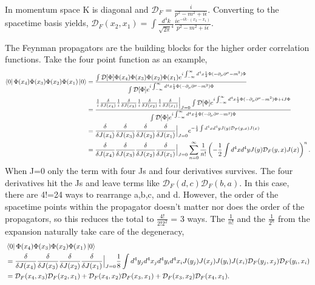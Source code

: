 In momentum space K is diagonal and $\mathcal{D}_F = \frac{i}{p^2-m^2 + i\epsilon}$. Converting to the spacetime basis yields, $\mathcal{D}_F(x_2,x_1) = \int \frac{d^4k}{\sqrt{2\pi}^4}\frac{i e^{-ik\cdot(x_2-x_1)}}{p^2-m^2 + i\epsilon}$. 

The Feynman propagators are the building blocks for the higher order correlation functions. Take the four point function as an example,
%
\begin{equation}
\begin{split}
\bra{0}\Phi(x_4)\Phi(x_3)\Phi(x_2)\Phi(x_1)\ket{0} &= 
\frac{\int \mathcal{D}[\Phi]\Phi(x_4)\Phi(x_3)\Phi(x_2)\Phi(x_1)e^{i\int_{-\infty}^{\infty} d^4x \frac{1}{2}\Phi (-\partial_\mu\partial^\mu - m^2)\Phi}}
{\int \mathcal{D}[\Phi]e^{i\int_{-\infty}^{\infty} d^4x \frac{1}{2}\Phi (-\partial_\mu\partial^\mu - m^2)\Phi}} \\
&= \frac{\frac{1}{i}\frac{\delta}{\delta J(x_4)}\frac{1}{i}\frac{\delta}{\delta J(x_3)}\frac{1}{i}\frac{\delta}{\delta J(x_2)}\frac{1}{i}\frac{\delta}{\delta J(x_1)}\Big|_{J=0}\int \mathcal{D}[\Phi]e^{i\int_{-\infty}^{\infty} d^4x \frac{1}{2}\Phi (-\partial_\mu\partial^\mu - m^2)\Phi + iJ\Phi}}
{\int \mathcal{D}[\Phi]e^{i\int_{-\infty}^{\infty} d^4x \frac{1}{2}\Phi (-\partial_\mu\partial^\mu - m^2)\Phi}} \\
&= \frac{\delta}{\delta J(x_4)}\frac{\delta}{\delta J(x_3)}\frac{\delta}{\delta J(x_2)}\frac{\delta}{\delta J(x_1)}\Big|_{J=0}e^{-\frac{1}{2}\int d^4x d^4y J(y) \mathcal{D}_F(y,x) J(x)} \\
&= \frac{\delta}{\delta J(x_4)}\frac{\delta}{\delta J(x_3)}\frac{\delta}{\delta J(x_2)}\frac{\delta}{\delta J(x_1)}\Big|_{J=0} 
\sum_{n=0}^\infty \frac{1}{n!}\left( -\frac{1}{2}\int d^4x d^4y J(y) \mathcal{D}_F(y,x) J(x) \right)^n. 
\end{split}
\end{equation}
When J=0 only the term with four Js and four derivatives survives. The four derivatives hit the Js and leave terms like $\mathcal{D}_F(d,c) \mathcal{D}_F(b,a)$. In this case, there are 4!=24 ways to rearrange a,b,c, and d. However, the order of the spacetime points within the propagator doesn't matter nor does the order of the propagators, so this reduces the total to $\frac{4!}{2!2^2}$ = 3 ways. The $\frac{1}{n!}$ and the $\frac{1}{2^n}$ from the expansion naturally take care of the degeneracy,
%
\begin{equation}
\begin{split}
&\bra{0}\Phi(x_4)\Phi(x_3)\Phi(x_2)\Phi(x_1)\ket{0} \\
&= \frac{\delta}{\delta J(x_4)}\frac{\delta}{\delta J(x_3)}\frac{\delta}{\delta J(x_2)}\frac{\delta}{\delta J(x_1)}\Big|_{J=0} 
\frac{1}{8}\int d^4y_j d^4x_j d^4y_i d^4x_i J(y_j) J(x_j) J(y_i) J(x_i) \mathcal{D}_F(y_j,x_j) \mathcal{D}_F(y_i,x_i) \\ 
&= \mathcal{D}_F(x_4, x_3) \mathcal{D}_F(x_2, x_1) + \mathcal{D}_F(x_4, x_2) \mathcal{D}_F(x_3, x_1) + \mathcal{D}_F(x_3, x_2) \mathcal{D}_F(x_4, x_1).
\end{split}
\end{equation}
